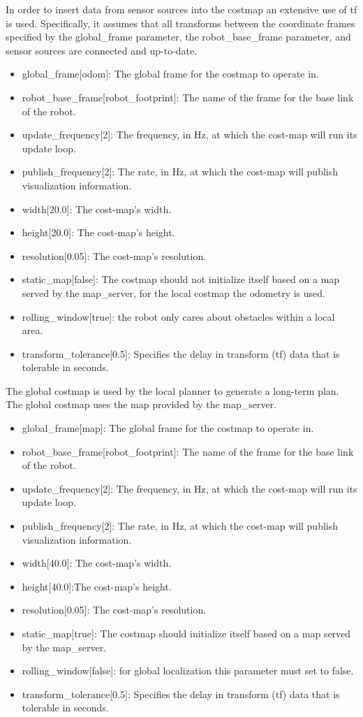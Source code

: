 \documentclass[10pt,journal,compsoc]{IEEEtran}
\begin{document}
In order to insert data from sensor sources into the costmap an extensive use of tf is used. Specifically, it assumes that all transforms between the coordinate frames specified by the global_frame parameter, the robot_base_frame parameter, and sensor sources are connected and up-to-date. 

\begin{itemize}
\item global\_frame[odom]: The global frame for the costmap to operate in.
\item robot\_base\_frame[robot\_footprint]: The name of the frame for the base link of the robot.
\item update\_frequency[2]: The frequency, in Hz, at which the cost-map will run its update loop. 
\item publish\_frequency[2]: The rate, in Hz, at which the cost-map will publish visualization information.
\item width[20.0]: The cost-map's width.
\item height[20.0]: The cost-map's height.
\item resolution[0.05]: The cost-map's resolution.
\item static\_map[false]: The costmap should not initialize itself based on a map served by the map\_server, for the local costmap the odometry is used.
\item rolling\_window[true]:  the robot only cares about obstacles within a local area.
\item transform\_tolerance[0.5]: Specifies the delay in transform (tf) data that is tolerable in seconds.
\end{itemize}

The global costmap is used by the local planner to generate a long-term plan. The global costmap uses the map provided by the map\_server.

\begin{itemize}
\item global\_frame[map]: The global frame for the costmap to operate in.
\item robot\_base\_frame[robot\_footprint]: The name of the frame for the base link of the robot. 
\item update\_frequency[2]: The frequency, in Hz, at which the cost-map will run its update loop. 
\item publish\_frequency[2]: The rate, in Hz, at which the cost-map will publish visualization information.
\item width[40.0]: The cost-map's width.
\item height[40.0]:The cost-map's height.
\item resolution[0.05]: The cost-map's resolution.
\item static\_map[true]: The costmap should initialize itself based on a map served by the map\_server.
\item rolling\_window[false]: for global localization this parameter must set to false.
\item transform\_tolerance[0.5]: Specifies the delay in transform (tf) data that is tolerable in seconds. 
\end{itemize}
\end{document}
